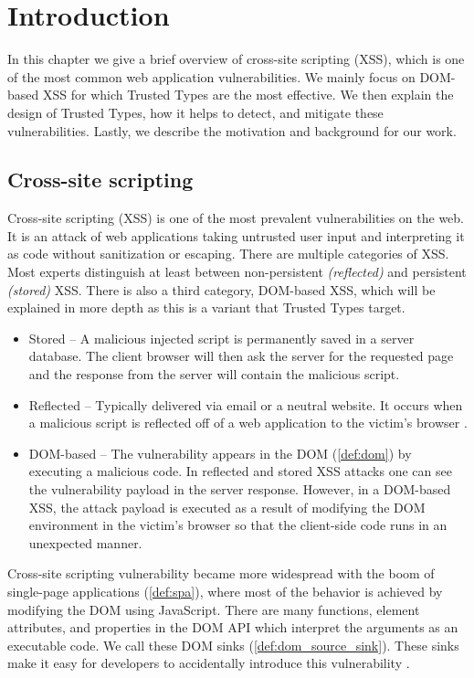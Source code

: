 \chapter{Introduction}
\label{chapter_intro}

In this chapter we give a brief overview of cross-site scripting (XSS), which is one of the most
common web application vulnerabilities. We mainly focus on DOM-based XSS for which Trusted Types are
the most effective. We then explain the design of Trusted Types, how it helps to detect, and
mitigate these vulnerabilities. Lastly, we describe the motivation and background for our work.

\section{Cross-site scripting}

Cross-site scripting (XSS) is one of the most prevalent vulnerabilities on the web. It is an attack
of web applications taking untrusted user input and interpreting it as code without sanitization or
escaping. There are multiple categories of XSS. Most experts distinguish at least between
non-persistent \emph{(reflected)} and persistent \emph{(stored)} XSS. There is also a third
category, DOM-based XSS, which will be explained in more depth as this is a variant that Trusted
Types target.

\begin{itemize}
  \item  Stored -- A malicious injected script is permanently saved in a server database. The client
        browser will then ask the server for the requested page and the response from the server
        will contain the malicious script.
  \item  Reflected -- Typically delivered via email or a neutral website. It occurs when a
        malicious script is reflected off of a web application to the victim's browser
        \cite{reflected_xss}.
  \item  DOM-based -- The vulnerability appears in the DOM (\ref{def:dom}) by executing a malicious
        code. In reflected and stored XSS attacks one can see the vulnerability payload in the
        server response. However, in a DOM-based XSS, the attack payload is executed as a result of
        modifying the DOM environment in the victim's browser so that the client-side code runs in
        an unexpected manner.
\end{itemize}

Cross-site scripting vulnerability became more widespread with the boom of single-page applications
(\ref{def:spa}), where most of the behavior is achieved by modifying the DOM using JavaScript. There
are many functions, element attributes, and properties in the DOM API which interpret the arguments
as an executable code. We call these DOM sinks (\ref{def:dom_source_sink}). These sinks make it easy
for developers to accidentally introduce this vulnerability \cite{tt_web_framework_paper}.

